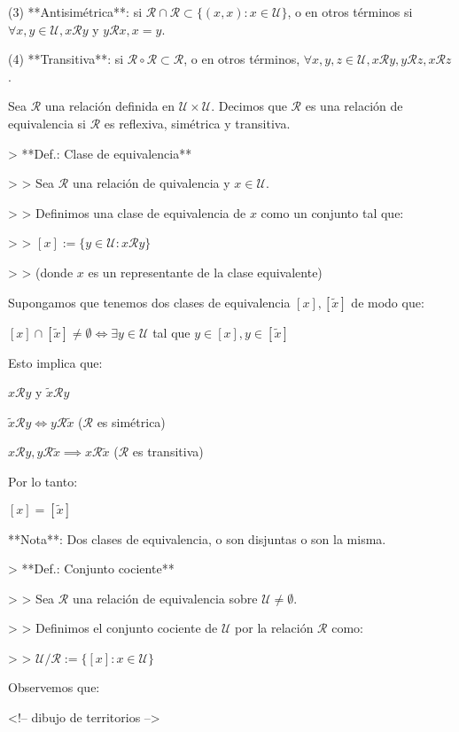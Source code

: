 (3) **Antisimétrica**: si $\mathcal{R} \cap \mathcal{R} \subset \{(x,x): x \in \mathcal{U}\}$, o en otros términos si $\forall x,y \in \mathcal{U}, x \mathcal{R} y$ y $y \mathcal{R} x, x=y$.

(4) **Transitiva**: si $\mathcal{R} \circ \mathcal{R} \subset \mathcal{R}$, o en otros términos, $\forall x,y,z \in \mathcal{U}, x \mathcal{R} y, y \mathcal{R} z, x \mathcal{R} z$.

Sea $\mathcal{R}$ una relación definida en $\mathcal{U} \times \mathcal{U}$. Decimos que $\mathcal{R}$ es una relación de equivalencia si $\mathcal{R}$ es reflexiva, simétrica y transitiva.

> **Def.: Clase de equivalencia**

> > Sea $\mathcal{R}$ una relación de quivalencia y $x \in \mathcal{U}$.

> > Definimos una clase de equivalencia de $x$ como un conjunto tal que:

> > $[x] := \{y \in \mathcal{U}: x \mathcal{R} y\}$

> > (donde $x$ es un representante de la clase equivalente)

Supongamos que tenemos dos clases de equivalencia $[x], [\tilde{x}]$ de modo que:

$[x] \cap [\tilde{x}] \neq \emptyset \iff \exists y \in \mathcal{U}$ tal que $y \in [x], y \in [\tilde{x}]$

Esto implica que:

$x \mathcal{R} y$ y $\tilde{x} \mathcal{R} y$

$\tilde{x} \mathcal{R} y \iff y \mathcal{R} \tilde{x}$ ($\mathcal{R}$ es simétrica)

$x \mathcal{R} y, y \mathcal{R} \tilde{x} \implies x \mathcal{R} \tilde{x}$ ($\mathcal{R}$ es transitiva)

Por lo tanto:

$[x] = [\tilde{x}]$

**Nota**: Dos clases de equivalencia, o son disjuntas o son la misma.

> **Def.: Conjunto cociente**

> > Sea $\mathcal{R}$ una relación de equivalencia sobre $\mathcal{U} \neq \emptyset$.

> > Definimos el conjunto cociente de $\mathcal{U}$ por la relación $\mathcal{R}$ como:

> > $\mathcal{U}/\mathcal{R} := \{[x]: x \in \mathcal{U}\}$ 

Observemos que:

<!--
dibujo de territorios
-->

